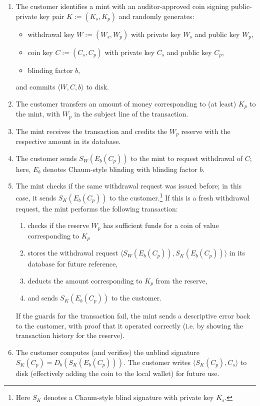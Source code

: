 \documentclass{llncs}
\begin{document}
\begin{enumerate}
  \item The customer identifies a mint with an auditor-approved
        coin signing public-private key pair $K := (K_s, K_p)$
        and randomly generates:
        \begin{itemize}
           \item withdrawal key $W := (W_s,W_p)$ with private key $W_s$ and public key $W_p$,
           \item coin key $C := (C_s,C_p)$ with private key $C_s$ and public key $C_p$,
           \item blinding factor $b$,
        \end{itemize}
        and commits $\langle W, C, b \rangle$ to disk.
  \item The customer transfers an amount of money corresponding to (at least) $K_p$ to the mint, with $W_p$ in the subject line of the transaction.
  \item The mint receives the transaction and credits the $W_p$ reserve with the respective amount in its database.
  \item The customer sends $S_W(E_b(C_p))$ to the mint to request withdrawal of $C$; here, $E_b$ denotes Chaum-style blinding with blinding factor $b$.
  \item The mint checks if the same withdrawal request was issued before; in this case, it sends $S_{K}(E_b(C_p))$ to the customer.\footnote{Here $S_K$
        denotes a Chaum-style blind signature with private key $K_s$.}
        If this is a fresh withdrawal request, the mint performs the following transaction:
        \begin{enumerate}
           \item checks if the reserve $W_p$ has sufficient funds for a coin of value corresponding to $K_p$
           \item stores the withdrawal request $\langle S_W(E_b(C_p)), S_K(E_b(C_p)) \rangle$ in its database for future reference,
           \item deducts the amount corresponding to $K_p$ from the reserve,
           \item and sends $S_{K}(E_b(C_p))$ to the customer.
        \end{enumerate}
        If the guards for the transaction fail, the mint sends a descriptive error back to the customer,
        with proof that it operated correctly (i.e. by showing the transaction history for the reserve).
  \item The customer computes (and verifies) the unblind signature $S_K(C_p) = D_b(S_K(E_b(C_p)))$.
        The customer writes $\langle S_K(C_p), C_s \rangle$ to disk (effectively adding the coin to the
        local wallet) for future use.
\end{enumerate}
\end{document}
